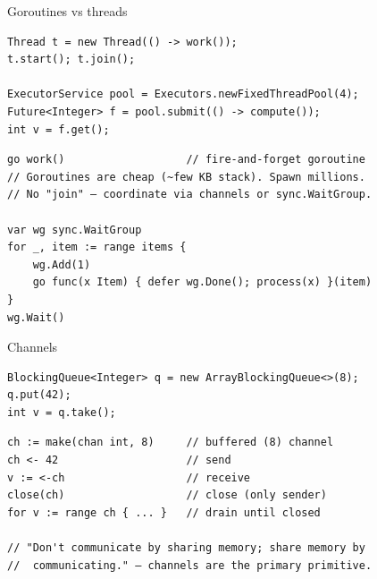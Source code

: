 \documentclass[10pt]{article}
\begin{document}
\begin{construct}{Goroutines vs threads}
\noindent
\begin{minipage}[t]{0.485\linewidth}
\begin{lstlisting}[style=java, title=Java]
Thread t = new Thread(() -> work());
t.start(); t.join();

ExecutorService pool = Executors.newFixedThreadPool(4);
Future<Integer> f = pool.submit(() -> compute());
int v = f.get();
\end{lstlisting}
\end{minipage}\hfill
\begin{minipage}[t]{0.485\linewidth}
\begin{lstlisting}[style=go, title=Go]
go work()                   // fire-and-forget goroutine
// Goroutines are cheap (~few KB stack). Spawn millions.
// No "join" — coordinate via channels or sync.WaitGroup.

var wg sync.WaitGroup
for _, item := range items {
    wg.Add(1)
    go func(x Item) { defer wg.Done(); process(x) }(item)
}
wg.Wait()
\end{lstlisting}
\end{minipage}
\end{construct}

\begin{construct}{Channels}
\noindent
\begin{minipage}[t]{0.485\linewidth}
\begin{lstlisting}[style=java, title=Java]
BlockingQueue<Integer> q = new ArrayBlockingQueue<>(8);
q.put(42);
int v = q.take();
\end{lstlisting}
\end{minipage}\hfill
\begin{minipage}[t]{0.485\linewidth}
\begin{lstlisting}[style=go, title=Go]
ch := make(chan int, 8)     // buffered (8) channel
ch <- 42                    // send
v := <-ch                   // receive
close(ch)                   // close (only sender)
for v := range ch { ... }   // drain until closed

// "Don't communicate by sharing memory; share memory by
//  communicating." — channels are the primary primitive.
\end{lstlisting}
\end{minipage}
\end{construct}
\end{document}

